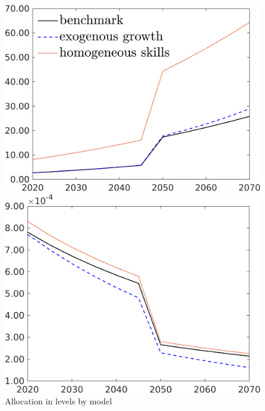  \begin{figure}[h!!]
	\centering
	\caption{Allocation in levels by model}\label{fig:comp_mod_allo_lev}
	\begin{minipage}[]{0.32\textwidth}
		\includegraphics[width=1\textwidth]{../../codding_model/own_basedOnFried/optimalPol_190722_tidiedUp/figures/all_10Aout22/CompMod1_OPT_T_NoTaus_GFF_regime3_spillover0_noskill0_sep1_xgrowth0_extern0_PV1_etaa0.79_lgd1.png}
	\end{minipage}
	\begin{minipage}[]{0.32\textwidth}
		\includegraphics[width=1\textwidth]{../../codding_model/own_basedOnFried/optimalPol_190722_tidiedUp/figures/all_10Aout22/CompMod1_OPT_T_NoTaus_Lf_regime3_spillover0_noskill0_sep1_xgrowth0_extern0_PV1_etaa0.79_lgd0.png}

\end{minipage}
\end{figure}
